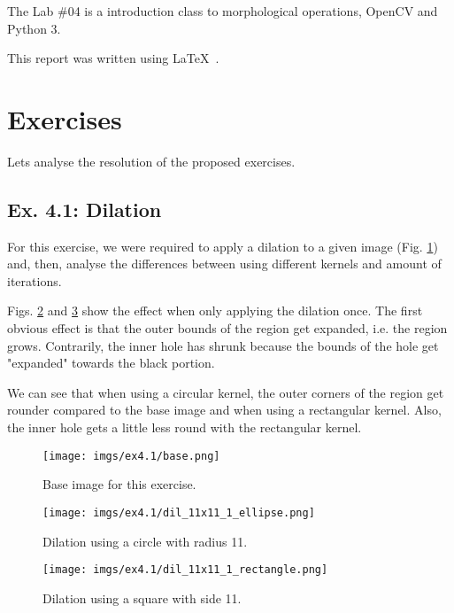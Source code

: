 \documentclass[journal]{IEEEtran}
\begin{document}
The Lab \#04 is a introduction class to morphological operations, OpenCV and Python 3. 

This report was written using \LaTeX\ .

\section{Exercises}

Lets analyse the resolution of the proposed exercises.

\subsection{Ex. 4.1: Dilation}
\label{sec:dilation}

For this exercise, we were required to apply a dilation to a given image (Fig. \ref{fig:4.1_base}) and, then, analyse the differences between using different kernels and amount of iterations. 

Figs. \ref{fig:4.1_dil_11x11_1_ellipse} and \ref{fig:4.1_dil_11x11_1_rectangle} show the effect when only applying the dilation once. The first obvious effect is that the outer bounds of the region get expanded, i.e. the region grows. Contrarily, the inner hole has shrunk because the bounds of the hole get "expanded" towards the black portion.

We can see that when using a circular kernel, the outer corners of the region get rounder compared to the base image and when using a rectangular kernel. Also, the inner hole gets a little less round with the rectangular kernel.

\begin{figure}[htp]
  \centering
  \texttt{[image: imgs/ex4.1/base.png]}
  \caption{Base image for this exercise.}
  \label{fig:4.1_base}
\end{figure}
\FloatBarrier

\begin{figure}[htp]
  \centering
  \texttt{[image: imgs/ex4.1/dil\_11x11\_1\_ellipse.png]}
  \caption{Dilation using a circle with radius 11.}
  \label{fig:4.1_dil_11x11_1_ellipse}
\end{figure}
\FloatBarrier

\begin{figure}[htp]
  \centering
  \texttt{[image: imgs/ex4.1/dil\_11x11\_1\_rectangle.png]}
  \caption{Dilation using a square with side 11.}
  \label{fig:4.1_dil_11x11_1_rectangle}
\end{figure}
\FloatBarrier
\end{document}
